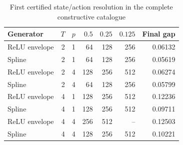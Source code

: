 \begin{table}[tbp]
\centering
\caption{First certified state/action resolution in the complete constructive catalogue}\label{tab:constructive45}
\begin{tabular}{lrrrrrr}
\toprule
Generator & $T$ & $p$ & $0.5$ & $0.25$ & $0.125$ & Final gap \\
\midrule
ReLU envelope & 2 & 1 & 64 & 128 & 256 & 0.06132 \\
Spline & 2 & 1 & 64 & 128 & 256 & 0.05619 \\
ReLU envelope & 2 & 4 & 128 & 256 & 512 & 0.06274 \\
Spline & 2 & 4 & 64 & 128 & 256 & 0.05799 \\
ReLU envelope & 4 & 1 & 128 & 256 & 512 & 0.12236 \\
Spline & 4 & 1 & 128 & 256 & 512 & 0.09711 \\
ReLU envelope & 4 & 4 & 256 & 512 & -- & 0.12503 \\
Spline & 4 & 4 & 128 & 256 & 512 & 0.10221 \\
\bottomrule
\end{tabular}
\par{}
\end{table}
